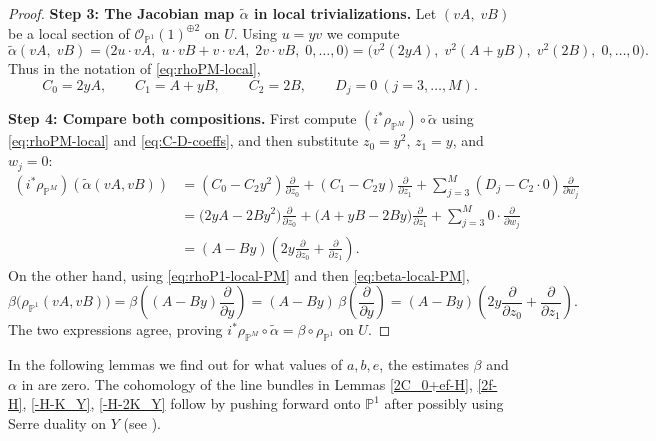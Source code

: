 \documentclass[11pt,twoside]{amsart}
\theoremstyle{plain}
\numberwithin{equation}{section}
\theoremstyle{definition}
\newcommand{\PP}{\mathbb{P}}
\newcommand{\OO}{\mathcal{O}}
\begin{document}
\begin{proof}
\medskip
\noindent\textbf{Step 3: The Jacobian map $\widetilde\alpha$ in local trivializations.}
Let $(vA,\;vB)$ be a local section of $\OO_{\PP^1}(1)^{\oplus 2}$ on $U$.
Using $u=yv$ we compute
\[
\widetilde\alpha(vA,\;vB)
=
\bigl(2u\cdot vA,\; u\cdot vB+v\cdot vA,\;2v\cdot vB,\;0,\dots,0\bigr)
=
\bigl(v^2(2yA),\;v^2(A+yB),\;v^2(2B),\;0,\dots,0\bigr).
\]
Thus in the notation of \eqref{eq:rhoPM-local},
\begin{equation}\label{eq:C-D-coeffs}
C_0=2yA,\qquad C_1=A+yB,\qquad C_2=2B,\qquad D_j=0\ (j=3,\dots,M).
\end{equation}

\medskip
\noindent\textbf{Step 4: Compare both compositions.}
First compute $(i^*\rho_{\PP^M})\circ \widetilde\alpha$ using
\eqref{eq:rhoPM-local} and \eqref{eq:C-D-coeffs}, and then substitute
$z_0=y^2$, $z_1=y$, and $w_j=0$:
\begin{align*}
(i^*\rho_{\PP^M})(\widetilde\alpha(vA,vB))
&=
(C_0-C_2 y^2)\frac{\partial}{\partial z_0}
+(C_1-C_2 y)\frac{\partial}{\partial z_1}
+\sum_{j=3}^M (D_j-C_2\cdot 0)\frac{\partial}{\partial w_j}\\
&=
\bigl(2yA-2B y^2\bigr)\frac{\partial}{\partial z_0}
+\bigl(A+yB-2By\bigr)\frac{\partial}{\partial z_1}
+\sum_{j=3}^M 0\cdot \frac{\partial}{\partial w_j}\\
&=
(A-By)\left(2y\frac{\partial}{\partial z_0}+\frac{\partial}{\partial z_1}\right).
\end{align*}
On the other hand, using \eqref{eq:rhoP1-local-PM} and then \eqref{eq:beta-local-PM},
\[
\beta\bigl(\rho_{\PP^1}(vA,vB)\bigr)
=
\beta\!\left((A-By)\frac{\partial}{\partial y}\right)
=
(A-By)\,\beta\!\left(\frac{\partial}{\partial y}\right)
=
(A-By)\left(2y\frac{\partial}{\partial z_0}+\frac{\partial}{\partial z_1}\right).
\]
The two expressions agree, proving $i^*\rho_{\PP^M}\circ \widetilde\alpha=\beta\circ \rho_{\PP^1}$
on $U$. 
\end{proof}

\color{black}

In the following lemmas we find out for what values of $a, b, e$, the estimates $\beta$ and $\alpha$ in  are zero. The cohomology of the line bundles in Lemmas \ref{2C_0+ef-H}, \ref{2f-H}, \ref{-H-K_Y}, \ref{-H-2K_Y} follow by pushing forward onto $\mathbb{P}^1$ after possibly using Serre duality on $Y$ (see \cite[III, Ex $8.4$]{Hartshorne}).
\end{document}
